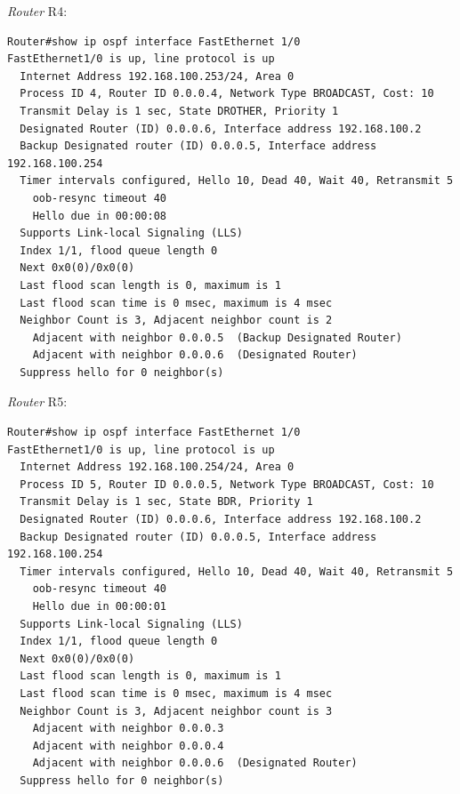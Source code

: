 \emph{Router} \textsf{R4}:
\begin{verbatim}
Router#show ip ospf interface FastEthernet 1/0
FastEthernet1/0 is up, line protocol is up 
  Internet Address 192.168.100.253/24, Area 0 
  Process ID 4, Router ID 0.0.0.4, Network Type BROADCAST, Cost: 10
  Transmit Delay is 1 sec, State DROTHER, Priority 1 
  Designated Router (ID) 0.0.0.6, Interface address 192.168.100.2
  Backup Designated router (ID) 0.0.0.5, Interface address 192.168.100.254
  Timer intervals configured, Hello 10, Dead 40, Wait 40, Retransmit 5
    oob-resync timeout 40
    Hello due in 00:00:08
  Supports Link-local Signaling (LLS)
  Index 1/1, flood queue length 0
  Next 0x0(0)/0x0(0)
  Last flood scan length is 0, maximum is 1
  Last flood scan time is 0 msec, maximum is 4 msec
  Neighbor Count is 3, Adjacent neighbor count is 2 
    Adjacent with neighbor 0.0.0.5  (Backup Designated Router)
    Adjacent with neighbor 0.0.0.6  (Designated Router)
  Suppress hello for 0 neighbor(s)
\end{verbatim}

\emph{Router} \textsf{R5}:
\begin{verbatim}
Router#show ip ospf interface FastEthernet 1/0
FastEthernet1/0 is up, line protocol is up 
  Internet Address 192.168.100.254/24, Area 0 
  Process ID 5, Router ID 0.0.0.5, Network Type BROADCAST, Cost: 10
  Transmit Delay is 1 sec, State BDR, Priority 1 
  Designated Router (ID) 0.0.0.6, Interface address 192.168.100.2
  Backup Designated router (ID) 0.0.0.5, Interface address 192.168.100.254
  Timer intervals configured, Hello 10, Dead 40, Wait 40, Retransmit 5
    oob-resync timeout 40
    Hello due in 00:00:01
  Supports Link-local Signaling (LLS)
  Index 1/1, flood queue length 0
  Next 0x0(0)/0x0(0)
  Last flood scan length is 0, maximum is 1
  Last flood scan time is 0 msec, maximum is 4 msec
  Neighbor Count is 3, Adjacent neighbor count is 3 
    Adjacent with neighbor 0.0.0.3
    Adjacent with neighbor 0.0.0.4
    Adjacent with neighbor 0.0.0.6  (Designated Router)
  Suppress hello for 0 neighbor(s)
\end{verbatim}

